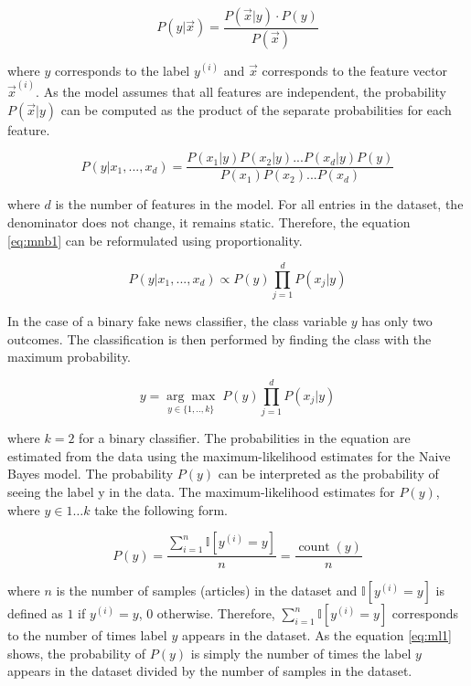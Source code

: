 \begin{equation}
    P(y | \Vec{x}) = \displaystyle{\frac{P(\Vec{x}|y) \cdot P(y)}{P(\Vec{x})}}
\end{equation}

where $y$ corresponds to the label $y^{(i)}$ and $\Vec{x}$ corresponds to the feature vector $\Vec{x}^{(i)}$. As the model assumes that all features are independent, the probability $P(\Vec{x}|y)$ can be computed as the product of the separate probabilities for each feature.

\begin{equation}    
    P(y | x_1, ..., x_d) = \displaystyle{\frac{P(x_1|y) P(x_2|y) ... P(x_d|y) P(y)}{P(x_1) P(x_2)...P(x_d)}}
    \label{eq:mnb1}
\end{equation}

where $d$ is the number of features in the model. For all entries in the dataset, the denominator does not change, it remains static. Therefore, the equation \ref{eq:mnb1} can be reformulated using proportionality.

\begin{equation}
    P(y|x_1, ..., x_d) \propto P(y) \prod_{j=1}^d P(x_j|y)
\end{equation}

In the case of a binary fake news classifier, the class variable $y$ has only two outcomes. The classification is then performed by finding the class with the maximum probability.

\begin{equation}    
    y = \underset{y\in\{1,..,k\}}{\arg\max} \; P(y) \prod_{j=1}^d P(x_j|y)
\end{equation}

where $k=2$ for a binary classifier. The probabilities in the equation are estimated from the data using the maximum-likelihood estimates for the Naive Bayes model. The probability $P(y)$ can be interpreted as the probability of seeing the label y in the data. The maximum-likelihood estimates for $P(y)$, where $y \in {1…k}$ take the following form.

\begin{equation}
    P(y) = \displaystyle{\frac{\sum_{i=1}^n \mathbb{I}[y^{(i)} = y]}{n} = \frac{\operatorname{count}(y)}{n}}
    \label{eq:ml1}
\end{equation}

where $n$ is the number of samples (articles) in the dataset and $\mathbb{I}[y^{(i)} = y]$ is defined as $1$ if $y^{(i)} = y$, $0$ otherwise. Therefore, $\sum_{i=1}^n \mathbb{I}[y^{(i)} = y]$ corresponds to the number of times label $y$ appears in the dataset. As the equation \ref{eq:ml1} shows, the probability of $P(y)$ is simply the number of times the label $y$ appears in the dataset divided by the number of samples in the dataset. 

